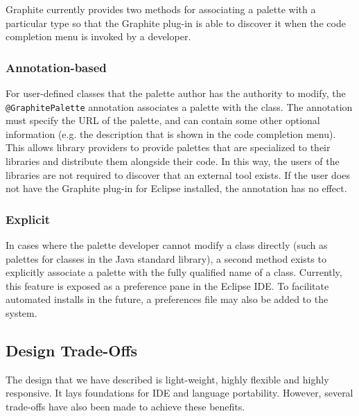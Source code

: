 \documentclass[10pt, conference, compsocconf]{IEEEtran}
\begin{document}
Graphite currently provides two methods for associating a palette with a particular type so that the Graphite plug-in is able to discover it when the code completion menu is invoked by a developer.

\subsubsection{Annotation-based}
For user-defined classes that the palette author has the authority to modify, the \texttt{@GraphitePalette} annotation associates a palette with the class. The annotation must specify the URL of the palette, and can contain some other optional information (e.g. the description that is shown in the code completion menu). This  allows library providers to provide palettes that are specialized to their libraries and distribute them alongside their code. In this way, the users of the libraries are not required to discover that an external tool exists. If the user does not have the Graphite plug-in for Eclipse installed, the annotation has no effect.

\subsubsection{Explicit}
In cases where the palette developer cannot modify a class directly (such as palettes for classes in the Java standard library), a second method exists to explicitly associate a palette with the fully qualified name of a class. Currently, this feature is exposed as a preference pane in the Eclipse IDE. To facilitate automated installs in the future, a preferences file may also be added to the system. 

\subsection{Design Trade-Offs}
The design that we have described is light-weight, highly flexible and highly responsive. It lays foundations for IDE and language portability. However, several trade-offs have also been made to achieve these benefits.
\end{document}
